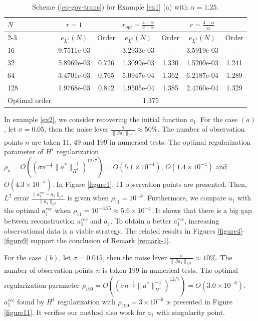 \documentclass[11pt]{article}
\numberwithin{equation}{section}
\begin{document}
\begin{table}[!ht]
\caption{Scheme (\ref{eq-gov-trans}) for Example \ref{ex1} (a) with $\alpha=1.25$.}
\renewcommand{\arraystretch}{1}
\def\temptablewidth{1\textwidth}
\begin{center}
 \begin{tabular*}{\temptablewidth}{@{\extracolsep{\fill}}lcccccc}\hline
 $N$ & $r=1$   &   &$r_{opt}=\frac{4-\alpha}{2-\alpha}$      &     &$r=\frac{4-\alpha}{\alpha}$  &    \\ 
 \cline{2-3}\cline{4-5}\cline{6-7}
 & $e_{L^{2}}(N)$         &Order     &$e_{L^{2}}(N)$    &Order    &$e_{L^{2}}(N)$ &Order     \\ \hline
 16 &9.7511e-03     &-      &3.2933e-03   &-       &3.5919e-03  &-  \\ 
 32 &5.8969e-03     &0.726  &1.3099e-03   &1.330   &1.5200e-03  &1.241    \\ 
 64 &3.4701e-03     &0.765  &5.0947e-04   &1.362   &6.2187e-04  &1.289 \\ 
 128 &1.9768e-03    &0.812  &1.9505e-04   &1.385   &2.4760e-04  &1.329    \\ 
 Optimal order  &\multicolumn{6}{c}{1.375} \\ \hline
\end{tabular*}
\end{center}
\end{table}
In example \ref{ex2}, we consider recovering the initial function $a_1$. For the case $(a)$, let $\sigma=0.05$, then the noise lever $\frac{\sigma}{\|Sa_1\|_{L^\infty}}\approx 50\%$. The number of observation points $n$ are taken $11$, $49$ and $199$ in numerical tests. The optimal regularization parameter of $H^1$ regularization $\rho_n = O((\sigma n^{-\frac12} \|a^*\|^{-1}_{H^1})^{12/7})=O(5.1\times10^{-4})$, $O(1.4\times10^{-4})$ and $O(4.3\times10^{-5})$. In Figure \ref{figure1}, 11 observation points are presented. Then, $L^2$ error $\frac{\|a_1^{rec}-a_1\|_{L^2}}{\|a_1\|_{L^2}}$ is given when $\rho_{11}=10^{-k}$. Furthermore, we compare $a_1$ with the optimal $a_1^{rec}$ when $\rho_{11}=10^{-3.25}\approx 5.6\times10^{-4}$. It shows that there is a big gap between reconstruction $a_1^{rec}$ and $a_1$. To obtain a better $a_1^{rec}$, increasing observational data is a viable strategy. The related results in Figures \ref{figure4}-\ref{figure9} support the conclusion of Remark \ref{remark-1}.

For the case $(b)$, let $\sigma=0.015$, then the noise lever $\frac{\sigma}{\|Sa_1\|_{L^\infty}}\approx 10\%$. The number of observation points $n$ is taken $199$ in numerical tests. The optimal regularization parameter $\rho_{199} = O((\sigma n^{-\frac12} \|a^*\|^{-1}_{H^1})^{12/7})=O(3.0\times10^{-6})$. $a_1^{rec}$ found by $H^1$ regularization with $\rho_{199}=3\times 10^{-6}$ is presented in Figure \ref{figure11}. It verifies our method also work for $a_1$ with singularity point.
\end{document}
